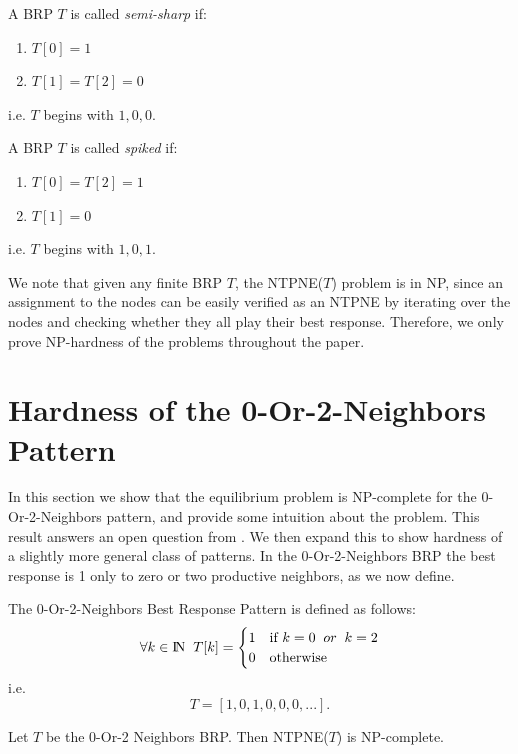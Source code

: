 \documentclass[runningheads]{llncs}
\begin{document}
\begin{definition}
A BRP $T$ is called \textit{semi-sharp} if:
\begin{enumerate}
    \item $T[0]=1$
    \item $T[1]=T[2]=0$
\end{enumerate}
i.e. $T$ begins with $1,0,0$.
\end{definition}

\begin{definition}
A BRP $T$ is called \textit{spiked} if:
\begin{enumerate}
    \item $T[0]=T[2]=1$
    \item $T[1]=0$
\end{enumerate}
i.e. $T$ begins with $1,0,1$.
\end{definition}

We note that given any finite BRP $T$, the NTPNE($T$) problem is in NP, since an assignment to the nodes can be easily verified as an NTPNE by iterating over the nodes and checking whether they all play their best response. Therefore, we only prove NP-hardness of the problems throughout the paper.
%
%
%
%
%
\section{Hardness of the 0-Or-2-Neighbors Pattern}
\label{sec_0_or_2}
In this section we show that the equilibrium problem is NP-complete for the 0-Or-2-Neighbors pattern, and provide some intuition about the problem. This result answers an open question from \cite{Gilboa_Nisan_public_goods}. We then expand this to show hardness of a slightly more general class of patterns.
In the 0-Or-2-Neighbors BRP the best response is 1 only to zero or two productive neighbors, as we now define.
\begin{definition}
The 0-Or-2-Neighbors Best Response Pattern is defined as follows:
\begin{align*}
\forall k\in {\rm I\!N} \;\; T[k]=    
    \begin{cases}
      1 & \text{if $k=0\;\; or \;\; k=2$}\\
      0  & \text{otherwise}
    \end{cases}
\end{align*}
i.e.
\[T=[1,0,1,0,0,0,...].\]
\end{definition}

\begin{theorem}
\label{thrm_0_or_2}
Let $T$ be the 0-Or-2 Neighbors BRP. Then NTPNE($T$) is NP-complete.
\end{theorem}
\end{document}
